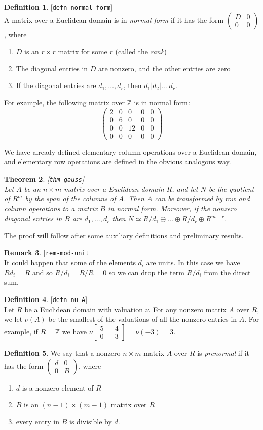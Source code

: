 \documentclass{amsart}
\newcommand{\lbl}[1]{\label{#1}\textup{[\texttt{#1}]}\ \\}
\newcommand{\lbl}{\label}
\newcommand{\bsm}       {\left[\begin{smallmatrix}}
\newcommand{\esm}       {\end{smallmatrix}\right]}
\newcommand{\Z}         {{\mathbb{Z}}}
\newcommand{\tm}        {\times}
\newcommand{\op}        {\oplus}
\newcommand{\blockmat}[4]{
 \left(\begin{array}{c|c} #1&#2 \\ \hline #3&#4\end{array}\right)}
\renewcommand{\:}{\colon}
\newtheorem{theorem}{Theorem}[section]
\theoremstyle{definition}
\newtheorem{remark}[theorem]{Remark}
\newtheorem{definition}[theorem]{Definition}
\begin{document}
\begin{definition}\lbl{defn-normal-form}
 A matrix over a Euclidean domain is in \emph{normal form} if it has
 the form $\blockmat{D}{0}{0}{0}$, where
 \begin{enumerate}
 \item $D$ is an $r\tm r$ matrix for some $r$ (called the \emph{rank})
 \item The diagonal entries in $D$ are nonzero, and the other entries
  are zero
 \item If the diagonal entries are $d_1,\ldots,d_r$, then
  $d_1|d_2|\ldots|d_r$. 
 \end{enumerate}
\end{definition}
For example, the following matrix over $\Z$ is in normal form:
\[ \left(\begin{array}{ccc|cc}
         2 & 0 &  0 & 0 & 0 \\
         0 & 6 &  0 & 0 & 0 \\
         0 & 0 & 12 & 0 & 0 \\ \hline
         0 & 0 &  0 & 0 & 0 
   \end{array}\right)
\]

We have already defined elementary column operations over a Euclidean
domain, and elementary row operations are defined in the obvious
analogous way.

\begin{theorem}\lbl{thm-gauss}
 Let $A$ be an $n\tm m$ matrix over a Euclidean domain $R$, and let
 $N$ be the quotient of $R^m$ by the span of the columns of $A$.  Then
 $A$ can be transformed by row and column operations to a matrix $B$
 in normal form.  Moreover, if the nonzero diagonal entries in $B$ are
 $d_1,\ldots,d_r$ then $N\simeq R/d_1\op\ldots\op R/d_r\op R^{m-r}$.
\end{theorem}

The proof will follow after some auxiliary definitions and preliminary
results.
\begin{remark}\lbl{rem-mod-unit}
 It could happen that some of the elements $d_i$ are units.  In this
 case we have $Rd_i=R$ and so $R/d_i=R/R=0$ so we can drop the term
 $R/d_i$ from the direct sum.  
\end{remark}

\begin{definition}\lbl{defn-nu-A}
 Let $R$ be a Euclidean domain with valuation $\nu$.  For any nonzero
 matrix $A$ over $R$, we let $\nu(A)$ be the smallest of the
 valuations of all the nonzero entries in $A$.  For example, if $R=\Z$
 we have $\nu\bsm 5 & -4\\0&-3\esm=\nu(-3)=3$.
\end{definition}
\begin{definition}
 We say that a nonzero $n\tm m$ matrix $A$ over $R$ is
 \emph{prenormal} if it has the form $\blockmat{d}{0}{0}{B}$, where
 \begin{enumerate}
 \item $d$ is a nonzero element of $R$
 \item $B$ is an $(n-1)\tm(m-1)$ matrix over $R$
 \item every entry in $B$ is divisible by $d$.
 \end{enumerate}
\end{definition}
\end{document}
